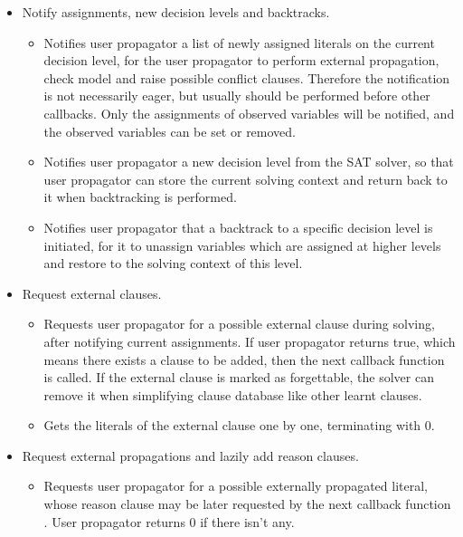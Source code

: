 \begin{itemize}
  \item Notify assignments, new decision levels and backtracks.
    \begin{itemize}
      \item {} Notifies user propagator a list of newly assigned literals on the current decision level, for the user propagator to perform external propagation, check model and raise possible conflict clauses. Therefore the notification is not necessarily eager, but usually should be performed before other callbacks. Only the assignments of observed variables will be notified, and the observed variables can be set or removed.
      \item {} Notifies user propagator a new decision level from the SAT solver, so that user propagator can store the current solving context and return back to it when backtracking is performed.
      \item {} Notifies user propagator that a backtrack to a specific decision level is initiated, for it to unassign variables which are assigned at higher levels and restore to the solving context of this level.
    \end{itemize}
  \item Request external clauses.
    \begin{itemize}
      \item {} Requests user propagator for a possible external clause during solving, after notifying current assignments. If user propagator returns true, which means there exists a clause to be added, then the next callback function  is called. If the external clause is marked as forgettable, the solver can remove it when simplifying clause database like other learnt clauses.
      \item {} Gets the literals of the external clause one by one, terminating with 0.  
    \end{itemize}
  \item Request external propagations and lazily add reason clauses.
    \begin{itemize}
      \item {} Requests user propagator for a possible externally propagated literal, whose reason clause may be later requested by the next callback function . User propagator returns 0 if there isn't any.

\end{itemize}
\end{itemize}
